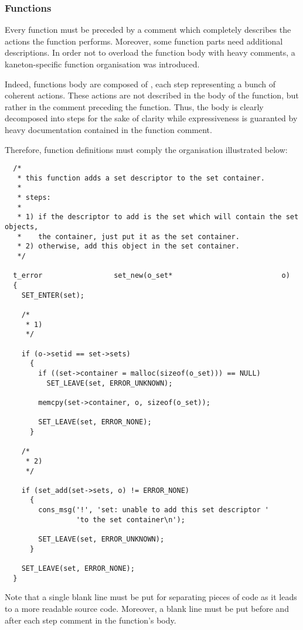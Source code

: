 \subsubsection{Functions}

Every function must be preceded by a comment which completely describes the
actions the function performs. Moreover, some function parts need additional
descriptions. In order not to overload the function body with heavy comments,
a kaneton-specific function organisation was introduced.

Indeed, functions body are composed of , each step representing
a bunch of coherent actions. These actions are not described in the body
of the function, but rather in the comment preceding the function. Thus,
the body is clearly decomposed into steps for the sake of clarity
while expressiveness is guaranted by heavy documentation contained in the
function comment.

Therefore, function definitions must comply the organisation illustrated
below:

\begin{verbatim}
  /*
   * this function adds a set descriptor to the set container.
   *
   * steps:
   *
   * 1) if the descriptor to add is the set which will contain the set objects,
   *    the container, just put it as the set container.
   * 2) otherwise, add this object in the set container.
   */

  t_error                 set_new(o_set*                          o)
  {
    SET_ENTER(set);

    /*
     * 1)
     */

    if (o->setid == set->sets)
      {
        if ((set->container = malloc(sizeof(o_set))) == NULL)
          SET_LEAVE(set, ERROR_UNKNOWN);

        memcpy(set->container, o, sizeof(o_set));

        SET_LEAVE(set, ERROR_NONE);
      }

    /*
     * 2)
     */

    if (set_add(set->sets, o) != ERROR_NONE)
      {
        cons_msg('!', 'set: unable to add this set descriptor '
                 'to the set container\n');

        SET_LEAVE(set, ERROR_UNKNOWN);
      }

    SET_LEAVE(set, ERROR_NONE);
  }
\end{verbatim}

Note that a single blank line must be put for separating pieces of code
as it leads to a more readable source code. Moreover, a blank line must
be put before and after each step comment in the function's body.


